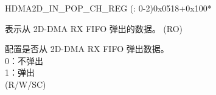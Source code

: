 \begin{register}{H}{DMA2D\_IN\_POP\_CH\_REG (: 0-2)}{0x0518+0x100*}\label{regdesc:DMA2DINPOPCHNREG}
%
%
%
\regnewline%
\begin{regdesc}\begin{reglist}
\label{fielddesc:DMA2DINFIFORDATACHN}\item [DMA2D\_INFIFO\_RDATA\_CH\regindex{n}] 表示从 2D-DMA RX FIFO 弹出的数据。 (RO)
\label{fielddesc:DMA2DINFIFOPOPCHN}\item [DMA2D\_INFIFO\_POP\_CH\regindex{n}] 配置是否从 2D-DMA RX FIFO 弹出数据。\\
0：不弹出\\
1：弹出\\ (R/W/SC)
\end{reglist}\end{regdesc}
\end{register}


